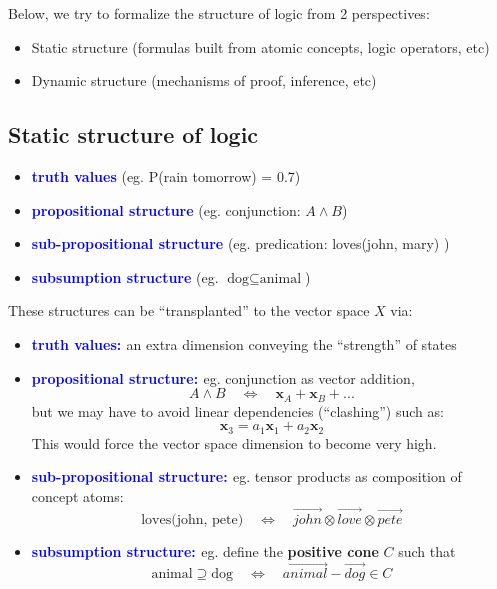 \documentclass[orivec]{llncs}
\newcommand{\emp}[1]{\textbf{\textcolor{blue}{#1}}}
\newcommand{\vect}[1]{\boldsymbol{#1}}
\begin{document}
Below, we try to formalize the structure of logic from 2 perspectives:
\begin{itemize}
\item Static structure (formulas built from atomic concepts, logic operators, etc)
\item Dynamic structure (mechanisms of proof, inference, etc)
\end{itemize}

\subsection{Static structure of logic}

\begin{itemize}
\item \emp{truth values} (eg. P(rain tomorrow) = 0.7)
\item \emp{propositional structure} (eg. conjunction: $A \wedge B$) 
\item \emp{sub-propositional structure} (eg. predication: loves(john, mary) )
\item \emp{subsumption structure} (eg. $\mbox{dog} \subseteq \mbox{animal}$)
\end{itemize}

These structures can be ``transplanted'' to the vector space $X$ via:
\begin{itemize}
\item \emp{truth values: } an extra dimension conveying the ``strength'' of states
\item \emp{propositional structure: } eg. conjunction as vector addition,
\begin{equation}
A \wedge B \quad \Leftrightarrow \quad \vect{x}_A + \vect{x}_B + ...
\end{equation}
but we may have to avoid linear dependencies (``clashing'') such as:
\begin{equation}
\vect{x}_3 = a_1 \vect{x}_1 + a_2 \vect{x}_2
\end{equation}
This would force the vector space dimension to become very high.
\item \emp{sub-propositional structure: } eg. tensor products as composition of concept atoms:
\begin{equation}
\mbox{loves(john, pete)} \quad \Leftrightarrow \quad \overrightarrow{john} \otimes \overrightarrow{love} \otimes \overrightarrow{pete}
\end{equation}
\item \emp{subsumption structure: } eg. define the \textbf{positive cone} $C$ such that
\begin{equation}
\mbox{animal} \supseteq \mbox{dog} \quad \Leftrightarrow \quad \overrightarrow{animal} - \overrightarrow{dog} \in C
\end{equation}
\end{itemize}
\end{document}
